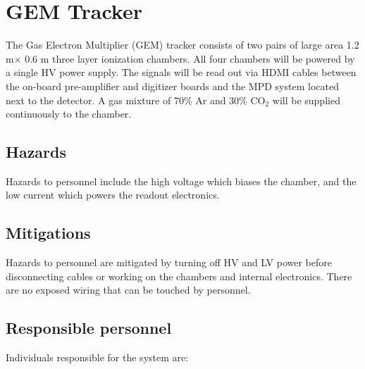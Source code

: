 \section{GEM Tracker}
The Gas Electron Multiplier (GEM) tracker consists of two pairs of large area 1.2 m× 0.6
m three layer ionization chambers. All four chambers will be powered by a single HV power
supply. The signals will be read out via HDMI cables between the on-board pre-amplifier
and digitizer boards and the MPD system located next to the detector. A gas mixture of
70\% Ar and 30\% CO$_2$ will be supplied continuously to the chamber.
\subsection{Hazards}
Hazards to personnel include the high voltage which biases the chamber, and the
low current which powers the readout electronics.
\subsection{Mitigations}
Hazards to personnel are mitigated by turning off HV and LV power before disconnecting cables or working on the chambers and internal electronics.
There are no exposed wiring that can be touched by personnel.
\subsection{Responsible personnel}
Individuals responsible for the system are: